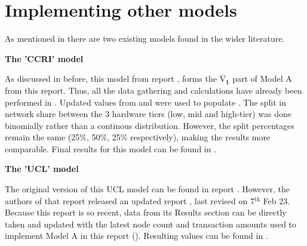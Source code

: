 \section{Implementing other models}

As mentioned in  there are two existing models found in the wider literature. 

\textbf{The 'CCRI' model} 

As discussed in  before, this model from report \cite{CryptoCarbonRatingsInstitute2022TheNetwork}, forms the $ \boldsymbol{\overline{\mathrm{V}}_{1}}$ part of Model A from this report. Thus, all the data gathering and calculations have already been performed in . Updated values from  and  were used to populate . The split in network share between the 3 hardware tiers (low, mid and high-tier) was done binomially rather than a continous distribution. However, the split percentages remain the same (25\%, 50\%, 25\% respectively), making the results more comparable. Final results for this model can be found in .

\textbf{The 'UCL' model} 

The original version of this UCL model can be found in report \cite{Platt2022TheProof-of-Work}. However, the authors of that report released an updated report \cite{IbanezTheExpansion}, last revised on 7$\mathrm{^{th}}$ Feb 23. Because this report is so recent, data from its Results section can be directly taken and updated with the latest node count and transaction amounts used to implement Model A in this report (). Resulting values can be found in . 







